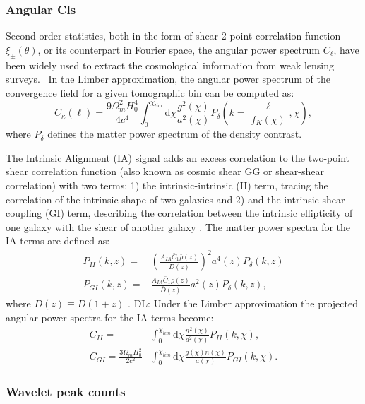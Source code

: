 \documentclass[twocolumn,twocolappendix]{aastex63}
\newcommand{\denise}[1]{{\color{red}DL: #1}}
\begin{document}
\subsubsection{Angular Cls
}
Second-order statistics, both in the form of shear 2-point correlation function $\xi_{\pm}(\theta)$, or its counterpart in Fourier space, the angular power spectrum $C_{\ell}$, have been widely used to extract the cosmological information from weak lensing surveys. \
In the Limber approximation, the angular power spectrum of the convergence field for a given tomographic bin can be computed as:
\begin{equation}
    C_{\kappa}(\ell)=\frac{9\Omega_m^2H_0^4}{4c^4}
    \int_0^{\chi_{lim}} \text{d}\chi 
    \frac{g^2(\chi)}{a^2(\chi)}P_{\delta}
    	\left( k=\frac{\ell}{f_K(\chi)},\chi \right),
\end{equation}
where $P_{\delta}$ defines the matter power spectrum of the density contrast.

The Intrinsic Alignment (IA) signal adds an excess correlation to the two-point shear correlation function (also known as cosmic shear GG or shear-shear correlation) with two terms: 1) the intrinsic-intrinsic (II) term, tracing the correlation of the intrinsic shape of two galaxies  and 2) and the intrinsic-shear coupling (GI) term, describing the correlation between the intrinsic ellipticity of one galaxy with the shear of another galaxy \citep{kilbinger2015cosmology}.
The matter power spectra for the IA terms are defined as:
\begin{align}
    P_{II}(k,z)=& \left ( \frac{A_{IA}\bar{C}_1\bar{\rho}(z)}{\bar{D}(z)} \right)^2 a^{4}(z)P_{\delta}(k,z) 
    \\
    P_{GI}(k,z)=&  \frac{A_{IA}\bar{C}_1\bar{\rho}(z)}{\bar{D}(z)} a^{2}(z)P_{\delta}(k,z),
\end{align}
where $\bar{D}(z) \equiv D(1+z)$ \citep{harnois2021cosmic}.
\denise{Under the Limber
approximation the projected angular power spectra for the IA terms become:
\begin{align}
    C_{II}=& \int_0^{\chi_{lim}} \text{d}\chi 
    \frac{n^2(\chi)}{a^2(\chi)}P_{II}(k,\chi), \\
    C_{GI}= \frac{3\Omega_m H_0^2}{2c^2} & \int_0^{\chi_{lim}} \text{d}\chi 
    \frac{g(\chi)n(\chi)}{a(\chi)}P_{GI}(k,\chi).
\end{align}
} 


\subsubsection{Wavelet peak counts}
\end{document}
